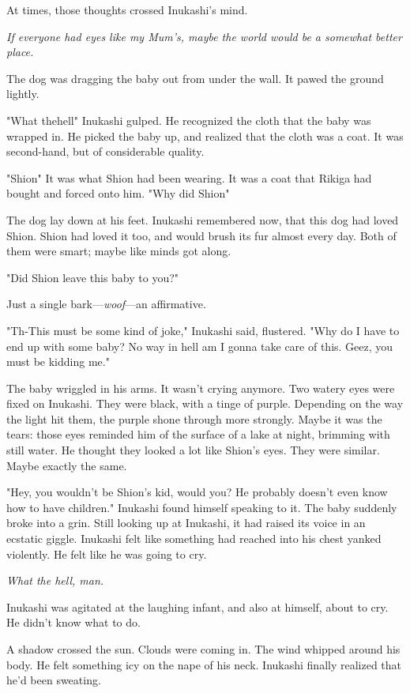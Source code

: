 At times, those thoughts crossed Inukashi's mind.

\emph{If everyone had eyes like my Mum's, maybe the world would be a somewhat
better place.}

The dog was dragging the baby out from under the wall. It pawed the
ground lightly.

"What the\el hell\el " Inukashi gulped. He recognized the cloth that the
baby was wrapped in. He picked the baby up, and realized that the cloth
was a coat. It was second-hand, but of considerable quality.

"Shion\el " It was what Shion had been wearing. It was a coat that Rikiga
had bought and forced onto him. "Why did Shion\el "

The dog lay down at his feet. Inukashi remembered now, that this dog had
loved Shion. Shion had loved it too, and would brush its fur almost
every day. Both of them were smart; maybe like minds got along.

"Did Shion leave this baby to you?"

Just a single bark---\emph{woof}---an affirmative.

"Th-This must be some kind of joke," Inukashi said, flustered. "Why do I
have to end up with some baby? No way in hell am I gonna take care of
this. Geez, you must be kidding me."

The baby wriggled in his arms. It wasn't crying anymore. Two watery eyes
were fixed on Inukashi. They were black, with a tinge of purple.
Depending on the way the light hit them, the purple shone through more
strongly. Maybe it was the tears: those eyes reminded him of the surface
of a lake at night, brimming with still water. He thought they looked a
lot like Shion's eyes. They were similar. Maybe exactly the same.

"Hey, you wouldn't be Shion's kid, would you? He probably doesn't even
know how to have children." Inukashi found himself speaking to it. The
baby suddenly broke into a grin. Still looking up at Inukashi, it had
raised its voice in an ecstatic giggle. Inukashi felt like something had
reached into his chest yanked violently. He felt like he was going to
cry.

\emph{What the hell, man.}

Inukashi was agitated at the laughing infant, and also at himself, about
to cry. He didn't know what to do.

A shadow crossed the sun. Clouds were coming in. The wind whipped around
his body. He felt something icy on the nape of his neck. Inukashi
finally realized that he'd been sweating.

